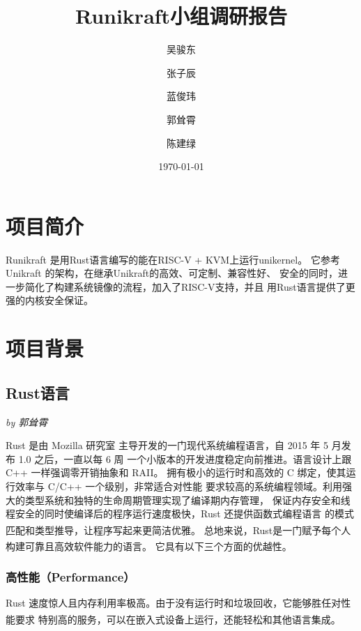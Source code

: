 \documentclass[UTF8,fontset=none,linespread=1.15]{ctexart}
\let\nosupcite\cite
\renewcommand*{\cite}[1]{\textsuperscript{\nosupcite{#1}}}
\newcommand{\sectionauthor}[1]{%
\vspace*{-5ex}
\noindent\textrm{\hfill\textit{by #1}}
\vspace*{2ex}\par}
\begin{document}
\sffamily %
\title{\bfseries Runikraft小组\quad 调研报告}
\author{吴骏东\and 张子辰\and 蓝俊玮\and 郭耸霄\and 陈建绿}
\date{\today}
\maketitle

\tableofcontents

\section{项目简介}
Runikraft 是用Rust语言编写的能在RISC-V + KVM上运行unikernel。
它参考 Unikraft 的架构，在继承Unikraft的高效、可定制、兼容性好、
安全的同时，进一步简化了构建系统镜像的流程，加入了RISC-V支持，并且
用Rust语言提供了更强的内核安全保证。
\section{项目背景}
\subsection{Rust语言}\sectionauthor{郭耸霄}

Rust 是由 Mozilla 研究室
主导开发的一门现代系统编程语言，自 2015 年 5 月发布 1.0 之后，一直以每 6 周
一个小版本的开发进度稳定向前推进。语言设计上跟 C++ 一样强调零开销抽象和 RAII。
拥有极小的运行时和高效的 C 绑定，使其运行效率与 C/C++ 一个级别，非常适合对性能
要求较高的系统编程领域。利用强大的类型系统和独特的生命周期管理实现了编译期内存管理，
保证内存安全和线程安全的同时使编译后的程序运行速度极快，Rust 还提供函数式编程语言
的模式匹配和类型推导，让程序写起来更简洁优雅。\cite{bib:2-why-rust}
总地来说，Rust是一门赋予每个人 构建可靠且高效软件能力的语言。\cite{bib:1-rust-lang}
它具有以下三个方面的优越性。

\subsubsection{高性能（Performance）}

Rust 速度惊人且内存利用率极高。由于没有运行时和垃圾回收，它能够胜任对性能要求
特别高的服务，可以在嵌入式设备上运行，还能轻松和其他语言集成。\cite{bib:1-rust-lang}
\end{document}
